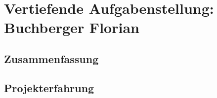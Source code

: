 \chapter[Buchberger]{Vertiefende Aufgabenstellung: Buchberger Florian}

\section{Zusammenfassung}

\section{Projekterfahrung}